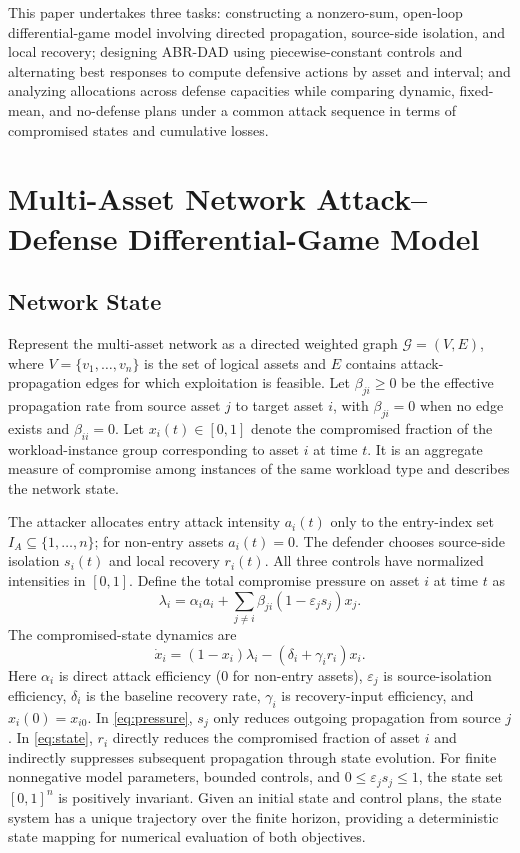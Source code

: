 \documentclass[conference,letterpaper]{IEEEtran}
\begin{document}
This paper undertakes three tasks: constructing a nonzero-sum, open-loop differential-game model involving directed propagation, source-side isolation, and local recovery; designing ABR-DAD using piecewise-constant controls and alternating best responses to compute defensive actions by asset and interval; and analyzing allocations across defense capacities while comparing dynamic, fixed-mean, and no-defense plans under a common attack sequence in terms of compromised states and cumulative losses.

\section{Multi-Asset Network Attack--Defense Differential-Game Model}
\subsection{Network State}
Represent the multi-asset network as a directed weighted graph $\mathcal{G}=(V,E)$, where $V=\{v_1,\ldots,v_n\}$ is the set of logical assets and $E$ contains attack-propagation edges for which exploitation is feasible. Let $\beta_{ji}\geq0$ be the effective propagation rate from source asset $j$ to target asset $i$, with $\beta_{ji}=0$ when no edge exists and $\beta_{ii}=0$. Let $x_i(t)\in[0,1]$ denote the compromised fraction of the workload-instance group corresponding to asset $i$ at time $t$. It is an aggregate measure of compromise among instances of the same workload type and describes the network state.

The attacker allocates entry attack intensity $a_i(t)$ only to the entry-index set $I_A\subseteq\{1,\ldots,n\}$; for non-entry assets $a_i(t)=0$. The defender chooses source-side isolation $s_i(t)$ and local recovery $r_i(t)$. All three controls have normalized intensities in $[0,1]$. Define the total compromise pressure on asset $i$ at time $t$ as
\begin{equation}\label{eq:pressure}
\lambda_i=\alpha_i a_i+\sum_{j\ne i}\beta_{ji}(1-\varepsilon_j s_j)x_j.
\end{equation}
The compromised-state dynamics are
\begin{equation}\label{eq:state}
\dot x_i=(1-x_i)\lambda_i-(\delta_i+\gamma_i r_i)x_i.
\end{equation}
Here $\alpha_i$ is direct attack efficiency ($0$ for non-entry assets), $\varepsilon_j$ is source-isolation efficiency, $\delta_i$ is the baseline recovery rate, $\gamma_i$ is recovery-input efficiency, and $x_i(0)=x_{i0}$. In \eqref{eq:pressure}, $s_j$ only reduces outgoing propagation from source $j$. In \eqref{eq:state}, $r_i$ directly reduces the compromised fraction of asset $i$ and indirectly suppresses subsequent propagation through state evolution. For finite nonnegative model parameters, bounded controls, and $0\leq\varepsilon_js_j\leq1$, the state set $[0,1]^n$ is positively invariant. Given an initial state and control plans, the state system has a unique trajectory over the finite horizon, providing a deterministic state mapping for numerical evaluation of both objectives.
\end{document}
